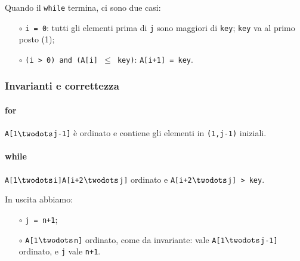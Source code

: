 

\vspace{0.5cm}

Quando il \texttt{while} termina, ci sono due casi: 
\begin{itemize}
	\item[$\circ$] \texttt{i = 0}: tutti gli elementi prima di \texttt{j} 
	sono maggiori di \texttt{key}; \texttt{key} va al primo posto (1);
	\item[$\circ$] \texttt{(i > 0) and (A[i] $\leq$ key)}: \texttt{A[i+1] = key}.
\end{itemize}

\subsubsection{Invarianti e correttezza}

\paragraph{for} \texttt{A[1$\twodots$j-1]} è ordinato e contiene gli 
elementi in \texttt{(1,j-1)} iniziali.

\paragraph{while} \texttt{A[1$\twodots$i]A[i+2$\twodots$j]} ordinato e 
\texttt{A[i+2$\twodots$j] > key}. \par
\vspace{0.5cm}
In uscita abbiamo: 
\begin{itemize}[noitemsep]
	\item[$\circ$] \texttt{j = n+1}; \par
	\item[$\circ$] \texttt{A[1$\twodots$n]} ordinato, come da invariante: 
	vale \texttt{A[1$\twodots$j-1]}	ordinato, e \texttt{j} vale \texttt{n+1}.
\end{itemize}